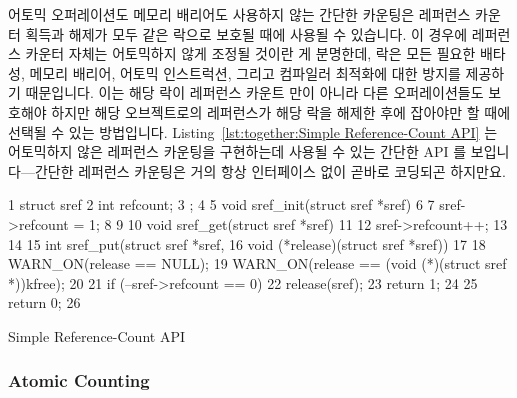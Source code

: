 어토믹 오퍼레이션도 메모리 배리어도 사용하지 않는 간단한 카운팅은 레퍼런스
카운터 획득과 해제가 모두 같은 락으로 보호될 때에 사용될 수 있습니다.
이 경우에 레퍼런스 카운터 자체는 어토믹하지 않게 조정될 것이란 게 분명한데,
락은 모든 필요한 배타성, 메모리 배리어, 어토믹 인스트럭션, 그리고 컴파일러
최적화에 대한 방지를 제공하기 때문입니다.
이는 해당 락이 레퍼런스 카운트 만이 아니라 다른 오퍼레이션들도 보호해야 하지만
해당 오브젝트로의 레퍼런스가 해당 락을 해제한 후에 잡아야만 할 때에 선택될 수
있는 방법입니다.
Listing~\ref{lst:together:Simple Reference-Count API} 는 어토믹하지 않은
레퍼런스 카운팅을 구현하는데 사용될 수 있는 간단한 API 를 보입니다---간단한
레퍼런스 카운팅은 거의 항상 인터페이스 없이 곧바로 코딩되곤 하지만요.
\iffalse

Simple counting, with neither atomic operations nor memory barriers,
can be used when the reference-counter acquisition and release are
both protected by the same lock.
In this case, it should be clear that the reference count itself
may be manipulated non-atomically, because the lock provides any
necessary exclusion, memory barriers, atomic instructions, and disabling
of compiler optimizations.
This is the method of choice when the lock is required to protect
other operations in addition to the reference count, but where
a reference to the object must be held after the lock is released.
Listing~\ref{lst:together:Simple Reference-Count API} shows a simple
API that might be used to implement simple non-atomic reference
counting---although simple reference counting is almost always
open-coded instead.
\fi

\begin{listing}[tbp]
{ \scriptsize
\begin{verbbox}
  1 struct sref {
  2   int refcount;
  3 };
  4
  5 void sref_init(struct sref *sref)
  6 {
  7   sref->refcount = 1;
  8 }
  9
 10 void sref_get(struct sref *sref)
 11 {
 12   sref->refcount++;
 13 }
 14
 15 int sref_put(struct sref *sref,
 16              void (*release)(struct sref *sref))
 17 {
 18   WARN_ON(release == NULL);
 19   WARN_ON(release == (void (*)(struct sref *))kfree);
 20
 21   if (--sref->refcount == 0) {
 22     release(sref);
 23     return 1;
 24   }
 25   return 0;
 26 }
\end{verbbox}
}
\centering
\theverbbox
\caption{Simple Reference-Count API}
\label{lst:together:Simple Reference-Count API}
\end{listing}

\subsubsection{Atomic Counting}
\label{sec:together:Atomic Counting}

